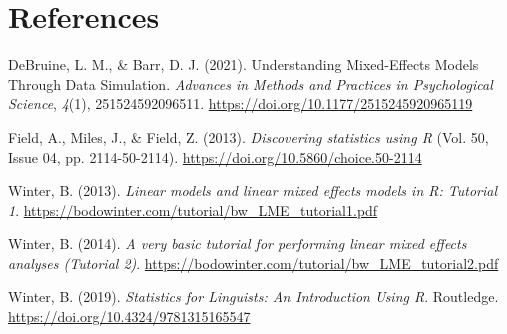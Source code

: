 \documentclass[
  letterpaper,
  DIV=11,
  numbers=noendperiod]{scrartcl}
\newlength{\cslhangindent}
\newlength{\cslentryspacingunit} %
\newenvironment{CSLReferences}[2] %
 {%
  \setlength{\parindent}{0pt}
  \ifodd #1
  \let\oldpar\par
  \def\par{\hangindent=\cslhangindent\oldpar}
  \fi
  \setlength{\parskip}{#2\cslentryspacingunit}
 }%
 {}
\begin{document}
\hypertarget{references}{%
\section*{References}\label{references}}

\hypertarget{refs}{}
\begin{CSLReferences}{1}{0}
\leavevmode{}%
DeBruine, L. M., \& Barr, D. J. (2021). Understanding Mixed-Effects
Models Through Data Simulation. \emph{Advances in Methods and Practices
in Psychological Science}, \emph{4}(1), 251524592096511.
\url{https://doi.org/10.1177/2515245920965119}

\leavevmode{}%
Field, A., Miles, J., \& Field, Z. (2013). \emph{Discovering statistics
using R} (Vol. 50, Issue 04, pp. 2114-50-2114).
\url{https://doi.org/10.5860/choice.50-2114}

\leavevmode{}%
Winter, B. (2013). \emph{Linear models and linear mixed effects models
in R: Tutorial 1}.
\url{https://bodowinter.com/tutorial/bw_LME_tutorial1.pdf}

\leavevmode{}%
Winter, B. (2014). \emph{A very basic tutorial for performing linear
mixed effects analyses (Tutorial 2)}.
\url{https://bodowinter.com/tutorial/bw_LME_tutorial2.pdf}

\leavevmode{}%
Winter, B. (2019). \emph{Statistics for Linguists: An Introduction Using
R}. Routledge. \url{https://doi.org/10.4324/9781315165547}

\end{CSLReferences}
\end{document}
